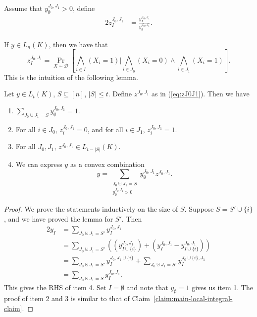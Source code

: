 \documentclass[a4paper,twoside,justified]{tufte-handout}
\begin{document}
\begin{definition}
  Assume that $y^{J_0,J_1}_{\emptyset}>0$, define
  \begin{alignat}{2}
    z^{J_0,J_1}_{I} &= \frac{y^{J_0,J_1}_I}{y^{J_0,J_1}_{\emptyset}}. \label{eq:zJ0J1}
  \end{alignat}
\end{definition}
If $y \in L_n(K)$, then we have that
\[
z^{J_0,J_1}_{I} = \Pr_{X \sim \mathscr{D}} \left[ \bigwedge_{i \in I} (X_i=1) | 
\bigwedge_{i \in J_0} (X_i=0) \wedge \bigwedge_{i \in J_1}(X_i=1) \right].
\]
This is the intuition of the following lemma.
\begin{lemma}\label{lemma:local-distribution}
  Let $y \in L_t(K)$, $S \subseteq [n]$, $|S| \le t$. Define $z^{J_0,J_1}$ as in (\ref{eq:zJ0J1}).
  Then we have
  \begin{enumerate}
    \item $\sum_{J_0 \cupdot J_1=S} y^{J_0,J_1}_{\emptyset} = 1$.
    \item For all $i \in J_0$, $z^{J_0,J_1}_{i}=0$, and for all $i \in J_1$, $z^{J_0,J_1}_{i}=1$.
    \item For all $J_0,J_1$, $z^{J_0,J_1} \in L_{t-|S|}(K)$.
    \item We can express $y$ as a convex combination
      \[
      y = \sum_{\substack{J_0 \cupdot J_1=S \\ y^{J_0,J_1}_{\emptyset}>0}} y^{J_0,J_1}_{\emptyset} z^{J_0,J_1}.
      \]
  \end{enumerate}
\end{lemma}
\begin{proof}
  We prove the statements inductively on the size of $S$. Suppose $S=S' \cup \{i\}$, and we have proved the lemma
  for $S'$. Then
  \begin{alignat*}{2}
    y_I &= \sum_{J_0 \cupdot J_1=S'} y^{J_0,J_1}_{I} \\
    &= \sum_{J_0 \cupdot J_1=S'} \left( (y^{J_0,J_1}_{I \cup \{i\}}) + (y^{J_0,J_1}_I - y^{J_0,J_1}_{I \cup \{i\}}) \right) \\
    &= \sum_{J_0 \cupdot J_1 = S'} y^{J_0,J_1 \cup \{i\}}_I + \sum_{J_0 \cupdot J_1=S'} y^{J_0 \cup \{i\},J_1}_I \\
    &= \sum_{J_0 \cupdot J_1=S} y^{J_0,J_1}_I.
  \end{alignat*}
  This gives the RHS of item 4. Set $I=\emptyset$ and note that $y_{\emptyset}=1$ gives us item 1. The proof of item 2 and 3 is
  similar to that of Claim~\ref{claim:main-local-integral-claim}. 
\end{proof}
\end{document}
